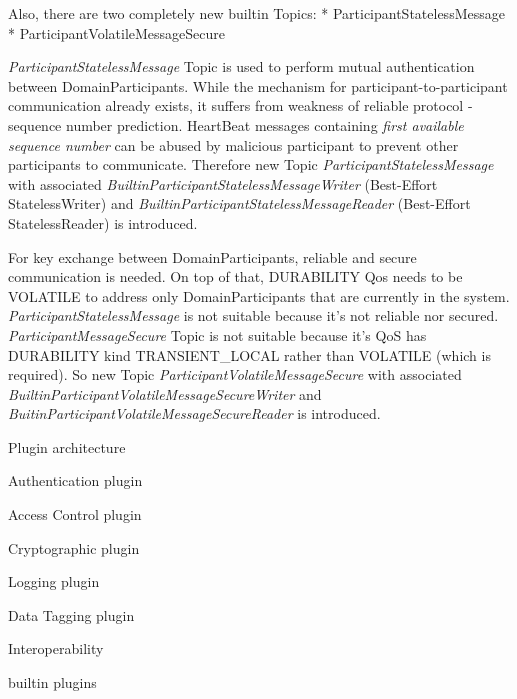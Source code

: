 Also, there are two completely new builtin Topics:
\begitems
* ParticipantStatelessMessage
* ParticipantVolatileMessageSecure
\enditems

{\em ParticipantStatelessMessage} Topic is used to perform mutual authentication between DomainParticipants. While the mechanism for participant-to-participant communication already exists, it suffers from weakness of reliable protocol - sequence number prediction. HeartBeat messages containing {\em first available sequence number} can be abused by malicious participant to prevent other participants to communicate. Therefore new Topic {\em ParticipantStatelessMessage} with associated {\em BuiltinParticipantStatelessMessageWriter} (Best-Effort StatelessWriter) and {\em BuiltinParticipantStatelessMessageReader} (Best-Effort StatelessReader) is introduced.  

For key exchange between DomainParticipants, reliable and secure communication is needed. On top of that, DURABILITY Qos needs to be VOLATILE to address only DomainParticipants that are currently in the system. {\em ParticipantStatelessMessage} is not suitable because it's not reliable nor secured. {\em ParticipantMessageSecure} Topic is not suitable because it's QoS has DURABILITY kind TRANSIENT\_LOCAL rather than VOLATILE (which is required). So new Topic {\em ParticipantVolatileMessageSecure} with associated {\em BuiltinParticipantVolatileMessageSecureWriter} and {\em BuitinParticipantVolatileMessageSecureReader} is introduced. 

\sec Plugin architecture

\secc Authentication plugin

\secc Access Control plugin

\secc Cryptographic plugin

\secc Logging plugin

\secc Data Tagging plugin



\sec Interoperability

builtin plugins

